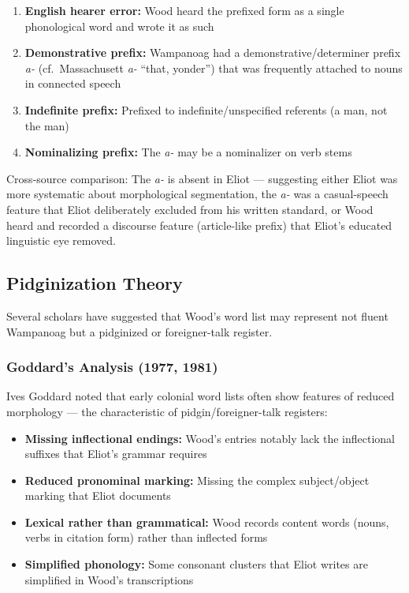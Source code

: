 \begin{enumerate}
  \item \textbf{English hearer error:} Wood heard the prefixed form as a single
    phonological word and wrote it as such
  \item \textbf{Demonstrative prefix:} Wampanoag had a demonstrative/determiner
    prefix \emph{a-} (cf.\ Massachusett \emph{a-} ``that, yonder'') that was
    frequently attached to nouns in connected speech
  \item \textbf{Indefinite prefix:} Prefixed to indefinite/unspecified referents
    (a man, not the man)
  \item \textbf{Nominalizing prefix:} The \emph{a-} may be a nominalizer on verb
    stems
\end{enumerate}

Cross-source comparison: The \emph{a-} is absent in Eliot --- suggesting either
Eliot was more systematic about morphological segmentation, the \emph{a-} was
a casual-speech feature that Eliot deliberately excluded from his written
standard, or Wood heard and recorded a discourse feature (article-like prefix)
that Eliot's educated linguistic eye removed.

\subsection{Pidginization Theory}

Several scholars have suggested that Wood's word list may represent not fluent
Wampanoag but a pidginized or foreigner-talk register.

\subsubsection{Goddard's Analysis (1977, 1981)}

Ives Goddard noted that early colonial word lists often show features of
reduced morphology --- the characteristic of pidgin/foreigner-talk registers:

\begin{itemize}
  \item \textbf{Missing inflectional endings:} Wood's entries notably lack the
    inflectional suffixes that Eliot's grammar requires
  \item \textbf{Reduced pronominal marking:} Missing the complex subject/object
    marking that Eliot documents
  \item \textbf{Lexical rather than grammatical:} Wood records content words
    (nouns, verbs in citation form) rather than inflected forms
  \item \textbf{Simplified phonology:} Some consonant clusters that Eliot writes
    are simplified in Wood's transcriptions
\end{itemize}

